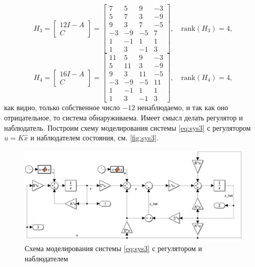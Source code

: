 \begin{equation*}
    H_3 = \begin{bmatrix}
    12 I - A \\ C
    \end{bmatrix} =
    \begin{bmatrix}
        7 & 5 & 9 & -3 \\
        5 & 7 & 3 & -9 \\
        9 & 3 & 7 & -5 \\
        -3 & -9 & -5 & 7 \\
        1 & -1 & 1 & 1 \\
        1 & 3 & -1 & 3   
    \end{bmatrix},\quad
    \text{rank}(H_3) = 4,
\end{equation*}
\begin{equation*}
    H_4 = \begin{bmatrix}
    16 I - A \\ C
    \end{bmatrix} =
    \begin{bmatrix}
        11 & 5  & 9  & -3 \\
         5 & 11 & 3  & -9 \\
         9 & 3  & 11 & -5 \\
        -3 & -9 & -5 & 11 \\
         1 & -1 & 1  & 1  \\
         1 & 3  & -1 & 3     
        \end{bmatrix},\quad
    \text{rank}(H_4) = 4,
\end{equation*}
как видно, только собственное число $-12$ ненаблюдаемо, и так как оно
отрицательное, то система обнаруживаема. Имеет смысл делать регулятор и наблюдатель.
Построим схему моделирования системы \eqref{eq:sys3} с регулятором $u=K\hat x$ и 
наблюдателем состояния, см. \autoref{fig:sys3}.
\begin{figure}[H]
    \centering
    \includegraphics[width=1\linewidth]{figs/3_slx.png}
    \caption{Схема моделирования системы \eqref{eq:sys3} с регулятором и наблюдателем}
    \label{fig:sys3}
\end{figure}
